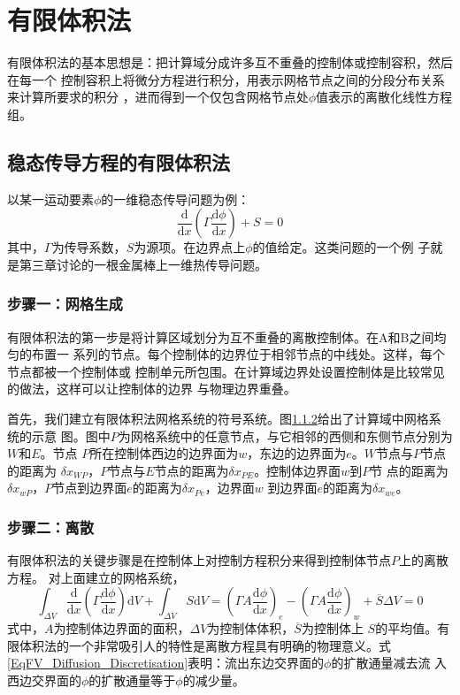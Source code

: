 \chapter{有限体积法}
有限体积法的基本思想是：把计算域分成许多互不重叠的控制体或控制容积，然后在每一个
控制容积上将微分方程进行积分，用表示网格节点之间的分段分布关系来计算所要求的积分
，进而得到一个仅包含网格节点处$\phi$值表示的离散化线性方程组。

\section{稳态传导方程的有限体积法}
以某一运动要素$\phi$的一维稳态传导问题为例：
\begin{equation}
  \frac{\mathrm{d}}{\mathrm{d} x}(\Gamma \frac{\mathrm{d} \phi}{\mathrm{d} x}) +
  S = 0
\end{equation}
其中，$\Gamma$为传导系数，$S$为源项。在边界点上$\phi$的值给定。这类问题的一个例
子就是第三章讨论的一根金属棒上一维热传导问题。

\subsection{步骤一：网格生成}
有限体积法的第一步是将计算区域划分为互不重叠的离散控制体。在A和B之间均匀的布置一
系列的节点。每个控制体的边界位于相邻节点的中线处。这样，每个节点都被一个控制体或
控制单元所包围。在计算域边界处设置控制体是比较常见的做法，这样可以让控制体的边界
与物理边界重叠。

首先，我们建立有限体积法网格系统的符号系统。图\ref{}给出了计算域中网格系统的示意
图。图中$P$为网格系统中的任意节点，与它相邻的西侧和东侧节点分别为$W$和$E$。节点
$P$所在控制体西边的边界面为$w$，东边的边界面为$e$。$W$节点与$P$节点的距离为
$\delta x_{WP}$，$P$节点与$E$节点的距离为$\delta x_{PE}$。控制体边界面$w$到$P$节
点的距离为$\delta x_{wP}$，$P$节点到边界面$e$的距离为$\delta x_{Pe}$，边界面$w$
到边界面$e$的距离为$\delta x_{we}$。

\subsection{步骤二：离散}
有限体积法的关键步骤是在控制体上对控制方程积分来得到控制体节点$P$上的离散方程。
对上面建立的网格系统，
\begin{equation}
  \int_{\Delta V}\!
  \frac{\mathrm{d} }{\mathrm{d} x}
  \left(
    \Gamma \frac{\mathrm{d} \phi}{\mathrm{d} x}
  \right)
  \mathrm{d}V
  +
  \int_{\Delta V}\!
  S
  \mathrm{d}V
  =
  \left(
    \Gamma A\frac{\mathrm{d} \phi}{\mathrm{d} x}
  \right)_{e}
  -
  \left(
    \Gamma A\frac{\mathrm{d} \phi}{\mathrm{d} x}
  \right)_{w}
  +
  \overline{S}\Delta V
  =
  0
  \label{EqFV_Diffusion_Discretisation}
\end{equation}
式中，$A$为控制体边界面的面积，$\Delta V$为控制体体积，$\overline{S}$为控制体上
$S$的平均值。有限体积法的一个非常吸引人的特性是离散方程具有明确的物理意义。式
\eqref{EqFV_Diffusion_Discretisation}表明：流出东边交界面的$\phi$的扩散通量减去流
入西边交界面的$\phi$的扩散通量等于$\phi$的减少量。

